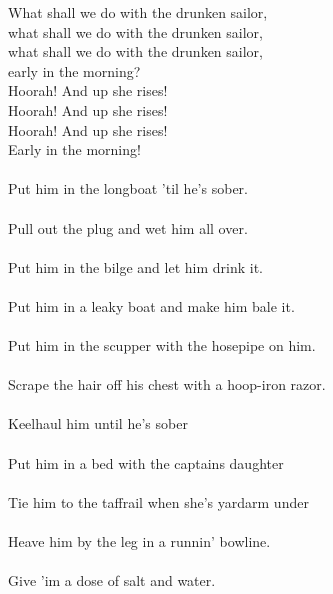 \vspace{10pt}
What shall we do with the drunken sailor,\\
what shall we do with the drunken sailor,\\
what shall we do with the drunken sailor,\\
early in the morning?\\
Hoorah! And up she rises!\\
Hoorah! And up she rises!\\
Hoorah! And up she rises!\\
Early in the morning!\\
\\
Put him in the longboat 'til he's sober.\\
\\
Pull out the plug and wet him all over.\\
\\
Put him in the bilge and let him drink it.\\
\\
Put him in a leaky boat and make him bale it.\\
\\
Put him in the scupper with the hosepipe on him.\\
\\
Scrape the hair off his chest with a hoop-iron razor.\\
\\
Keelhaul him until he's sober\\
\\
Put him in a bed with the captains daughter\\
\\
Tie him to the taffrail when she's yardarm under\\
\\
Heave him by the leg in a runnin' bowline.\\
\\
Give 'im a dose of salt and water.
